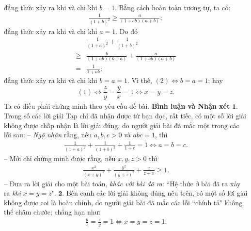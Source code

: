 \begin{multicols}{2}
\begin{align*}
	\end{align*}
	đẳng thức xảy ra khi và chỉ khi $b = 1$.
	\vskip 0.05cm
	Bằng cách hoàn toàn tương tự, ta có:
	\begin{align*}
		\frac{1}{{{{\left( {1 + b} \right)}^2}}} \ge \frac{a}{{\left( {1 + ab} \right)\left( {a + b} \right)}};
	\end{align*}
	đẳng thức xảy ra khi và chỉ khi $a = 1$.
	\vskip 0.05cm
	Do đó
	\begin{align*}
		&\frac{1}{{{{\left( {1 + a} \right)}^2}}} + \frac{1}{{{{\left( {1 + b} \right)}^2}}} \\
		\ge &\frac{b}{{\left( {1 + ab} \right)\left( {b + a} \right)}} + \frac{a}{{\left( {1 + ab} \right)\left( {a + b} \right)}} \\
		= &\frac{1}{{1 + ab}};
	\end{align*}
	đẳng thức xảy ra khi và chỉ khi $b = a = 1$.
	\vskip 0.05cm
	Vì thế, $(2) \Leftrightarrow b = a = 1$; hay
	\begin{align*}
		(1)  \Leftrightarrow  \dfrac{z}{y} = \dfrac{y}{x} = 1  \Leftrightarrow  x = y = z.
	\end{align*}
	Ta có điều phải chứng minh theo yêu cầu đề bài.
	\vskip 0.05cm
	\textbf{\color{thachthuctoanhoc}Bình luận và Nhận xét}
	\vskip 0.05cm
	$\pmb{1.}$ Trong số các lời giải Tạp chí đã nhận được từ bạn đọc, rất tiếc, có một số lời giải không được chấp nhận là lời giải đúng, do người giải bài đã mắc một trong các lỗi sau:
	\vskip 0.05cm
	-- \textit{Ngộ nhận} rằng, nếu $a, b, c > 0$ và $abc = 1$, thì
	\begin{align*}
		\frac{1}{{{{\left( {1 \!+\! a} \right)}^2}}} \!+\! \frac{1}{{{{\left( {1 \!+\! b} \right)}^2}}} \!+\! \frac{1}{{1 \!+\! c}} \!=\! 1 \!\Leftrightarrow\! a \!=\!b \!=\!c.
	\end{align*}
	-- Mới chỉ chứng minh được rằng, nếu $x, y, z > 0$ thì
	\begin{align*}
		\frac{{{x^2}}}{{{{\left( {x + y} \right)}^2}}} + \frac{{{y^2}}}{{{{\left( {y + z} \right)}^2}}} + \frac{z}{{z + x}} \ge 1.
	\end{align*}
	-- Đưa ra lời giải cho một bài toán, \textit{khác với bài đã ra}: ``Hệ thức ở bài đã ra xảy ra \textit{khi} $x = y = z$".
	\vskip 0.05cm
	$\pmb{2.}$ Bên cạnh các lời giải không đúng nêu trên, có một số lời giải không được coi là hoàn chỉnh, do người giải bài đã mắc các lỗi ``chính tả" không thể châm chước; chẳng hạn như:
	\begin{align*}
		\frac{y}{x} = \frac{z}{y} = 1 \Leftrightarrow  x = y = z = 1.
	\end{align*}

\end{multicols}
